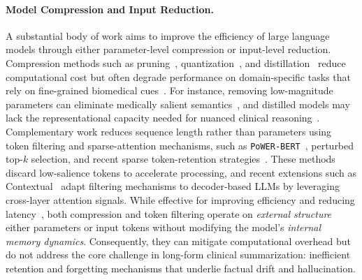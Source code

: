 \documentclass{article}
\begin{document}
\paragraph{Model Compression and Input Reduction.}
A substantial body of work aims to improve the efficiency of large language models through either parameter-level compression or input-level reduction. Compression methods such as pruning~\citep{frantar2023sparsegpt}, quantization~\citep{dettmers2022gpt3}, and distillation~\citep{hinton2015distilling} reduce computational cost but often degrade performance on domain-specific tasks that rely on fine-grained biomedical cues~\citep{tinn2023fine}. For instance, removing low-magnitude parameters can eliminate medically salient semantics~\citep{ma2023llm}, and distilled models may lack the representational capacity needed for nuanced clinical reasoning~\citep{ho2022large, magister2022teaching}. Complementary work reduces sequence length rather than parameters using token filtering and sparse-attention mechanisms, such as \texttt{PoWER-BERT}~\citep{goyal2020power}, perturbed top-$k$ selection, and recent sparse token-retention strategies~\citep{lin2024rho, lou2024sparser}. These methods discard low-salience tokens to accelerate processing, and recent extensions such as Contextual~\citep{piya2025contextual} adapt filtering mechanisms to decoder-based LLMs by leveraging cross-layer attention signals. While effective for improving efficiency and reducing latency~\citep{he2025survey}, both compression and token filtering operate on \emph{external structure} either parameters or input tokens without modifying the model’s \emph{internal memory dynamics}. Consequently, they can mitigate computational overhead but do not address the core challenge in long-form clinical summarization: inefficient retention and forgetting mechanisms that underlie factual drift and hallucination.
\end{document}
